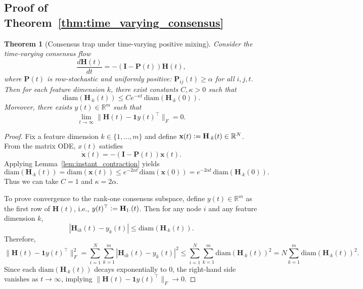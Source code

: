 \documentclass{article}
\newcommand{\defeq}{\vcentcolon=}
\theoremstyle{plain}
\newtheorem{theorem}{Theorem}[section]
\theoremstyle{definition}
\theoremstyle{remark}
\begin{document}
\subsection{Proof of Theorem~\ref{thm:time_varying_consensus}}
\begin{theorem}[Consensus trap under time-varying positive mixing]
    \label{thm:tv_consensus_trap_app}
    Consider the time-varying consensus flow
    \[
        \frac{d\textbf{H}(t)}{dt} = -(\textbf{I} - \textbf{P}(t))\textbf{H}(t),
    \]
    where $\textbf{P}(t)$ is row-stochastic and uniformly positive:
    $\textbf{P}_{ij}(t)\ge \alpha$ for all $i,j,t$. Then for each feature dimension
    $k$, there exist constants $C,\kappa>0$ such that
    \[
        \mathrm{diam}(\textbf{H}_{\cdot k}(t)) \le C e^{-\kappa t}\,\mathrm{diam}(\textbf{H}_{\cdot k}(0)).
    \]
    Moreover, there exists $y(t)\in\mathbb{R}^m$ such that
    \[
        \lim_{t\to\infty}\|\textbf{H}(t)-\mathbf{1}y(t)^\top\|_F = 0.
    \]
\end{theorem}

\begin{proof}
    Fix a feature dimension $k\in\{1,\dots,m\}$ and define $\textbf{x}(t)\defeq \textbf{H}_{\cdot k}(t)\in\mathbb{R}^N$.
    From the matrix ODE, $x(t)$ satisfies
    \[
        \dot{\textbf{x}}(t) = -(\textbf{I} - \textbf{P}(t))\textbf{x}(t).
    \]
    Applying Lemma~\ref{lem:instant_contraction} yields
    \[
        \mathrm{diam}(\textbf{H}_{\cdot k}(t)) = \mathrm{diam}(\textbf{x}(t))
        \le e^{-2\alpha t}\,\mathrm{diam}(\textbf{x}(0))
        = e^{-2\alpha t}\,\mathrm{diam}(\textbf{H}_{\cdot k}(0)).
    \]
    Thus we can take $C=1$ and $\kappa=2\alpha$.

    To prove convergence to the rank-one consensus subspace, define
    $y(t)\in\mathbb{R}^m$ as the first row of $\textbf{H}(t)$, i.e., $y(t)^\top
        \defeq \textbf{H}_{1\cdot}(t)$. Then for any node $i$ and any feature dimension
    $k$,
    \[
        |\textbf{H}_{ik}(t) - y_k(t)| \le \mathrm{diam}(\textbf{H}_{\cdot k}(t)).
    \]
    Therefore,
    \[
        \|\textbf{H}(t) - \mathbf{1}y(t)^\top\|_F^2
        = \sum_{i=1}^N \sum_{k=1}^m |\textbf{H}_{ik}(t)-y_k(t)|^2
        \le \sum_{i=1}^N \sum_{k=1}^m \mathrm{diam}(\textbf{H}_{\cdot k}(t))^2
        = N \sum_{k=1}^m \mathrm{diam}(\textbf{H}_{\cdot k}(t))^2.
    \]
    Since each $\mathrm{diam}(\textbf{H}_{\cdot k}(t))$ decays exponentially to
    $0$, the right-hand side vanishes as $t\to\infty$, implying
    $\|\textbf{H}(t)-\mathbf{1}y(t)^\top\|_F\to 0$.
\end{proof}
\end{document}
